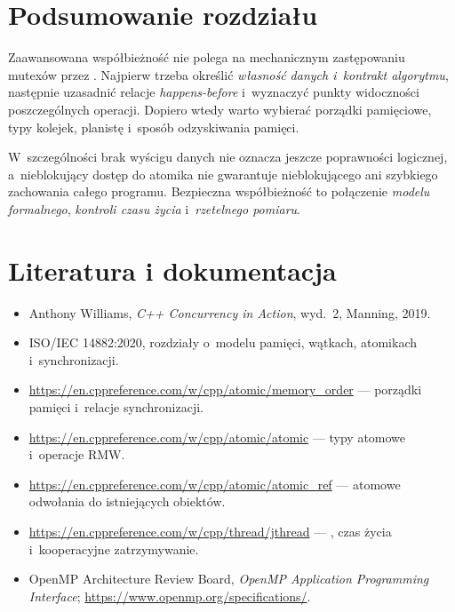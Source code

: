 \section*{Podsumowanie rozdziału}

Zaawansowana współbieżność nie polega na mechanicznym zastępowaniu
mutexów przez . Najpierw trzeba określić
\emph{własność danych i~kontrakt algorytmu}, następnie uzasadnić
relacje \emph{happens-before} i~wyznaczyć punkty widoczności
poszczególnych operacji. Dopiero wtedy warto wybierać porządki
pamięciowe, typy kolejek, planistę i~sposób odzyskiwania pamięci.

W~szczególności brak wyścigu danych nie oznacza jeszcze poprawności
logicznej, a~nieblokujący dostęp do atomika nie gwarantuje
nieblokującego ani szybkiego zachowania całego programu. Bezpieczna
współbieżność to połączenie \emph{modelu formalnego}, \emph{kontroli
czasu życia} i~\emph{rzetelnego pomiaru}.

\section*{Literatura i dokumentacja}
\begin{itemize}
\item Anthony Williams, \emph{C++ Concurrency in Action}, wyd.~2,
      Manning, 2019.
\item ISO/IEC 14882:2020, rozdziały o~modelu pamięci, wątkach,
      atomikach i~synchronizacji.
\item \url{https://en.cppreference.com/w/cpp/atomic/memory_order}
      --- porządki pamięci i~relacje synchronizacji.
\item \url{https://en.cppreference.com/w/cpp/atomic/atomic}
      --- typy atomowe i~operacje RMW.
\item \url{https://en.cppreference.com/w/cpp/atomic/atomic_ref}
      --- atomowe odwołania do istniejących obiektów.
\item \url{https://en.cppreference.com/w/cpp/thread/jthread}
      --- , czas życia i~kooperacyjne zatrzymywanie.
\item OpenMP Architecture Review Board,
      \emph{OpenMP Application Programming Interface};
      \url{https://www.openmp.org/specifications/}.
\end{itemize}
